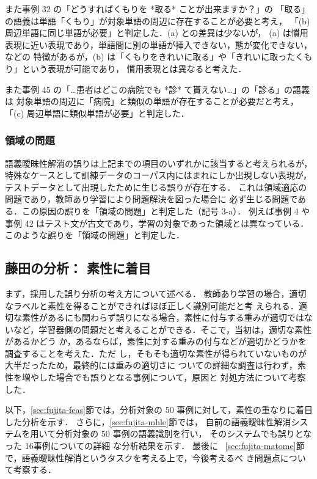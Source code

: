 \documentclass[japanese]{jnlp_1.4}
\begin{document}
また事例 32 の「どうすればくもりを *取る* ことが出来ますか？」の
「取る」の語義は単語「くもり」が対象単語の周辺に存在することが必要と考え，
「(b) 周辺単語に同じ単語が必要」と判定した．(a) との差異は少ないが，
(a) は慣用表現に近い表現であり，単語間に別の単語が挿入できない，態が変化できない，などの
特徴があるが，(b) は「くもりをきれいに取る」や「きれいに取ったくもり」という表現が可能であり，
慣用表現とは異なると考えた．

また事例 45 の「…患者はどこの病院でも *診* て貰えない…」の「診る」の語義は
対象単語の周辺に「病院」と類似の単語が存在することが必要だと考え，
「(c) 周辺単語に類似単語が必要」と判定した．


\subsubsection{領域の問題}

語義曖昧性解消の誤りは上記までの項目のいずれかに該当すると考えられるが，
特殊なケースとして訓練データのコーパス内にはまれにしか出現しない表現が，
テストデータとして出現したために生じる誤りが存在する．
これは領域適応の問題であり，教師あり学習により問題解決を図った場合に
必ず生じる問題である\cite{da-book}．この原因の誤りを「領域の問題」と判定した（記号 3-a）．
例えば事例 4 や事例 42 はテスト文が古文であり，学習の対象であった領域とは異なっている．
このような誤りを「領域の問題」と判定した．


\subsection{藤田の分析： 素性に着目}\label{sec:fujita}

まず，採用した誤り分析の考え方について述べる．
教師あり学習の場合，適切なラベルと素性を得ることができればほぼ正しく識別可能だと考
えられる．適切な素性があるにも関わらず誤りになる場合，素性に付与する重みが適切ではな
いなど，学習器側の問題だと考えることができる．そこで，当初は，適切な素性があるかどう
か，あるならば，素性に対する重みの付与などが適切かどうかを調査することを考えた．ただ
し，そもそも適切な素性が得られていないものが大半だったため，最終的には重みの適切さに
ついての詳細な調査は行わず，素性を増やした場合でも誤りとなる事例について，原因と
対処方法について考察した．


以下，\ref{sec:fujita-feas}節では，分析対象の 50 事例に対して，素性の重なりに着目した分析を示す．
さらに，\ref{sec:fujita-mhle}節では，
自前の語義曖昧性解消システムを用いて分析対象の 50 事例の語義識別を行い，
そのシステムでも誤りとなった 16事例についての詳細
な分析結果を示す．
最後に
~\ref{sec:fujita-matome}節で，語義曖昧性解消というタスクを考える上で，今後考えるべ
き問題点について考察する．
\end{document}
